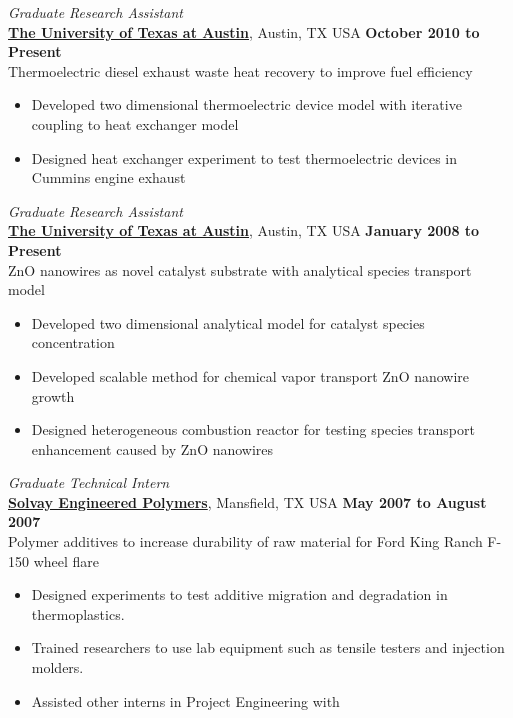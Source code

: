 \documentclass[centered]{res}
\begin{document}
\begin{resume}
\textit{Graduate Research Assistant} \\
\href{http://www.utexas.edu/}{\textbf{The University of Texas at
    Austin}}, Austin, TX USA%
\hfill \textbf{October 2010 to Present} \\
Thermoelectric diesel exhaust waste heat recovery to improve fuel
efficiency
\begin{itemize} \itemsep -2pt
\item Developed two dimensional thermoelectric device model with
  iterative coupling to heat exchanger model
\item Designed heat exchanger experiment to test thermoelectric
  devices in Cummins engine exhaust
\end{itemize} \vspace{-8pt}
%
\textit{Graduate Research Assistant} \\
\href{http://www.utexas.edu/}{\textbf{The University of Texas at
    Austin}}, Austin, TX USA%
\hfill \textbf{January 2008 to Present} \\
ZnO nanowires as novel catalyst substrate with analytical species
transport model
\begin{itemize} \itemsep -2pt %
\item Developed two dimensional analytical model for catalyst
  species concentration
\item Developed scalable method for chemical vapor transport ZnO
  nanowire growth
\item Designed heterogeneous combustion reactor for testing species
  transport enhancement caused by ZnO nanowires
\end{itemize} \vspace{-8pt}
%
\newpage{}
\textit{Graduate Technical Intern} \\
\href{http://www.lyondellbasell.com/LandingPages/SolvayEngineeredPolymers}{\textbf{Solvay
    Engineered Polymers}}, Mansfield, TX USA 
\hfill \textbf{May 2007 to August 2007} \\
Polymer additives to increase durability of raw material for Ford King
Ranch F-150 wheel flare
\begin{itemize} \itemsep -2pt %
\item Designed experiments to test additive migration
  and degradation in thermoplastics.
\item Trained researchers to use lab equipment such as tensile
  testers and injection molders.
\item Assisted other interns in Project Engineering with

\end{itemize}
\end{resume}
\end{document}
